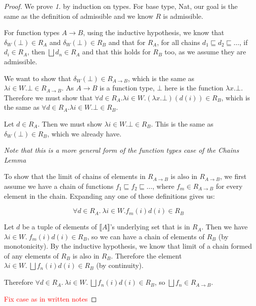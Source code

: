 \begin{proof}
We prove \emph{1.} by induction on types. For base type, Nat, our goal is the same as the definition of admissible and we know $R$ is admissible. 

For function types $A \to B$, using the inductive hypothesis, we know that $\delta_W(\bot) \in R_A$ and $\delta_W(\bot) \in R_B$ and that for $R_A$, for all chains $d_1 \sqsubseteq d_2 \sqsubseteq \dots$, if  $d_i \in R_A$, then $\bigsqcup d_n \in R_A$ and that this holds for $R_B$ too, as we assume they are admissible. 

We want to show that $\delta_W(\bot) \in R_{A \to B}$, which is the same as $\lambda i \in W. \bot \in R_{A \to B}$. As $A \to B$ is a function type, $\bot$ here is the function $\lambda x. \bot$. Therefore we must show that $\forall d \in R_A. \lambda i \in W. (\lambda x. \bot)(d(i)) \in R_B$, which is the same as $\forall d \in R_A. \lambda i \in W. \bot \in R_B$.

Let $d \in R_A$. Then we must show $\lambda i \in W. \bot \in R_B$. This is the same as $\delta_W(\bot) \in R_B$, which we already have.

\vspace{0.5cm}

\emph{Note that this is a more general form of the function types case of the Chains Lemma}

To show that the limit of chains of elements in  $R_{A \to B}$ is also in $R_{A \to B}$, we first assume we have a chain of functions $f_1 \sqsubseteq f_2 \sqsubseteq \dots$, where $f_m \in R_{A \to B}$ for every element in the chain. Expanding any one of these definitions gives us:

\[ \forall d \in R_A. \ \lambda i \in W. f_m(i)d(i) \in R_B\]

Let $d$ be a tuple of elements of $\llbracket A \rrbracket$'s underlying set that is in $R_A$. Then we have $\lambda i \in W. \ f_m(i)d(i) \in R_B$, so we can have a chain of elements of $R_B$ (by monotonicity). By the inductive hypothesis, we know that limit of a chain formed of  any elements of $R_B$ is also in $R_B$. Therefore the element $\lambda i \in W. \ \bigsqcup f_n(i)d(i) \in R_B$ (by continuity).

Therefore $\forall d \in R_A. \ \lambda i \in W. \ \bigsqcup f_n(i)d(i) \in R_B$, so $\bigsqcup f_n \in R_{A \to B}$.

\vspace{0.5cm}

\textcolor{red}{Fix case as in written notes}
\end{proof}

